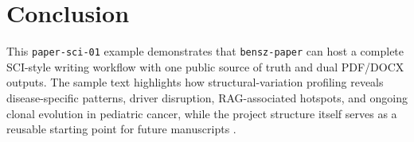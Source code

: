 \section{Conclusion}
This \texttt{paper-sci-01} example demonstrates that
\texttt{bensz-paper} can host a complete SCI-style writing workflow with
one public source of truth and dual PDF/DOCX outputs. The sample text
highlights how structural-variation profiling reveals disease-specific
patterns, driver disruption, RAG-associated hotspots, and ongoing clonal
evolution in pediatric cancer, while the project structure itself serves
as a reusable starting point for future manuscripts \supercite{Greenhalgh_2026}.
